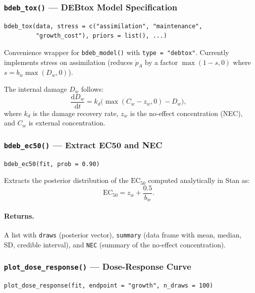 \documentclass[11pt,a4paper]{article}
\newcommand{\fn}[1]{\texttt{#1()}}
\newcommand{\code}[1]{\texttt{#1}}
\begin{document}
\subsubsection{\fn{bdeb\_tox} --- DEBtox Model Specification}

\begin{lstlisting}
bdeb_tox(data, stress = c("assimilation", "maintenance",
         "growth_cost"), priors = list(), ...)
\end{lstlisting}

Convenience wrapper for \fn{bdeb\_model} with \code{type = "debtox"}.
Currently implements stress on assimilation (reduces $\dot{p}_A$ by a
factor $\max(1 - s, 0)$ where $s = b_w \max(D_w, 0)$).

The internal damage $D_w$ follows:
\begin{equation}
\frac{\mathrm{d}D_w}{\mathrm{d}t} = k_d\bigl(\max(C_w - z_w, 0) - D_w\bigr),
\end{equation}
where $k_d$ is the damage recovery rate, $z_w$ is the no-effect
concentration (NEC), and $C_w$ is external concentration.

\subsubsection{\fn{bdeb\_ec50} --- Extract EC50 and NEC}

\begin{lstlisting}
bdeb_ec50(fit, prob = 0.90)
\end{lstlisting}

Extracts the posterior distribution of the $\text{EC}_{50}$ computed
analytically in Stan as:
\begin{equation}
\text{EC}_{50} = z_w + \frac{0.5}{b_w}.
\end{equation}

\paragraph{Returns.} A list with \code{draws} (posterior vector),
\code{summary} (data frame with mean, median, SD, credible interval), and
\code{NEC} (summary of the no-effect concentration).

\subsubsection{\fn{plot\_dose\_response} --- Dose-Response Curve}

\begin{lstlisting}
plot_dose_response(fit, endpoint = "growth", n_draws = 100)
\end{lstlisting}
\end{document}

